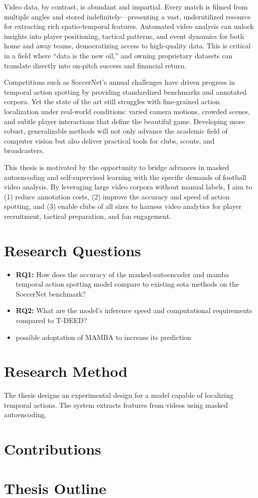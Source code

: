 Video data, by contrast, is abundant and impartial. Every match is filmed from multiple angles and stored indefinitely—presenting a vast, underutilized resource for extracting rich spatio‐temporal features. Automated video analysis can unlock insights into player positioning, tactical patterns, and event dynamics for both home and away teams, democratizing access to high‑quality data. This is critical in a field where “data is the new oil,” and owning proprietary datasets can translate directly into on‑pitch success and financial return.  

Competitions such as SoccerNet’s annual challenges have driven progress in temporal action spotting by providing standardized benchmarks and annotated corpora. Yet the state of the art still struggles with fine‐grained action localization under real‐world conditions: varied camera motions, crowded scenes, and subtle player interactions that define the beautiful game. Developing more robust, generalizable methods will not only advance the academic field of computer vision but also deliver practical tools for clubs, scouts, and broadcasters.  

This thesis is motivated by the opportunity to bridge advances in masked autoencoding and self‐supervised learning with the specific demands of football video analysis. By leveraging large video corpora without manual labels, I aim to (1) reduce annotation costs, (2) improve the accuracy and speed of action spotting, and (3) enable clubs of all sizes to harness video analytics for player recruitment, tactical preparation, and fan engagement.  

\section{Research Questions}

\begin{itemize}
    \item \textbf{RQ1:} How does the accuracy of the masked-autoencoder and mamba temporal action spotting model compare to existing \acrlong{sota} methods on the SoccerNet benchmark?
    \item \textbf{RQ2:} What are the model’s inference speed and computational requirements compared to T-DEED?
    \item possible adoptation of MAMBA to increase its prediction
\end{itemize}

\section{Research Method}

The thesis designs an experimental design for a model capable of localizing temporal actions. The system extracts features from videos using masked autoencoding.

\section{Contributions}

\section{Thesis Outline}


